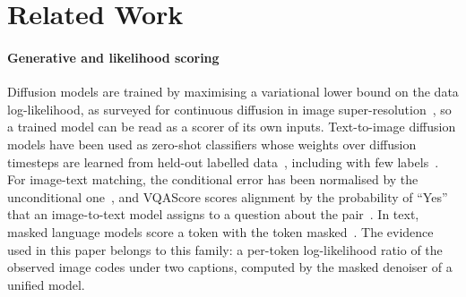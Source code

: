 
\section{Related Work}\label{sec:related}

\paragraph*{Generative and likelihood scoring}
Diffusion models are trained by maximising a variational lower bound on the data log-likelihood, as surveyed for continuous diffusion
in image super-resolution~\cite{moser2025diffusion}, so a trained model can be read as a scorer of its own inputs.
Text-to-image diffusion models have been used as zero-shot classifiers whose weights over diffusion timesteps are learned from held-out
labelled data~\cite{clark2023zeroshot}, including with few labels~\cite{jeong2025diffusion}.
For image-text matching, the conditional error has been normalised by the unconditional one~\cite{krojer2023diffusionitm}, and VQAScore
scores alignment by the probability of ``Yes'' that an image-to-text model assigns to a question about the pair~\cite{lin2024vqascore}.
In text, masked language models score a token with the token masked~\cite{salazar2020mlm,li2022uchecker}.
The evidence used in this paper belongs to this family: a per-token log-likelihood ratio of the observed image codes under two captions,
computed by the masked denoiser of a unified model.


